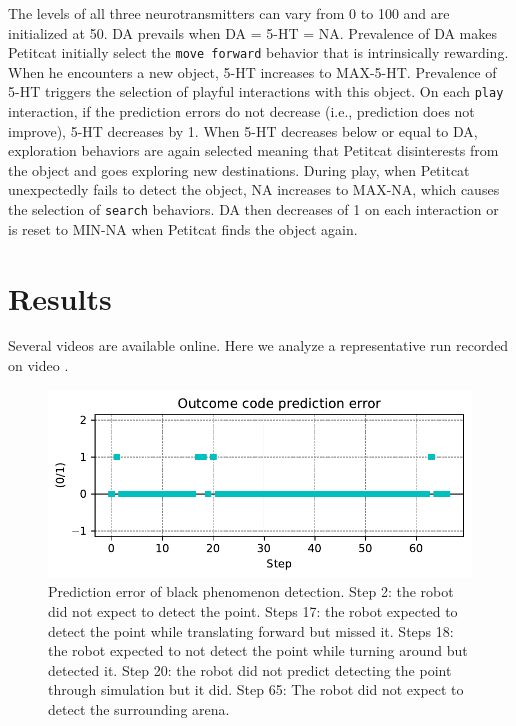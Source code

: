 \documentclass[runningheads]{llncs}
\begin{document}
The levels of all three neurotransmitters can vary from 0 to 100 and are initialized at 50. DA prevails when DA = 5-HT = NA.
Prevalence of DA makes Petitcat initially select the \texttt{move forward} behavior that is intrinsically rewarding.
When he encounters a new object, 5-HT increases to MAX-5-HT. Prevalence of 5-HT triggers the selection of playful interactions with this object.
On each  \texttt{play} interaction, if the prediction errors do not decrease (i.e., prediction does not improve), 5-HT decreases by 1.
When 5-HT decreases below or equal to DA, exploration behaviors are again selected meaning that Petitcat disinterests from the object and goes exploring new destinations. 
During play, when Petitcat unexpectedly fails to detect the object, NA increases to MAX-NA, which causes the selection of \texttt{search} behaviors. 
DA then decreases of 1 on each interaction or is reset to MIN-NA when Petitcat finds the object again.  





\section{Results}

Several videos are available online. 
Here we analyze a representative run recorded on video \cite{georgeon_petitcat_2024}.

\begin{figure}
	\includegraphics[width=\textwidth]{01_Outcome_code.pdf}
	\caption{Prediction error of black phenomenon detection.
	Step 2: the robot did not expect to detect the point.
	Steps 17: the robot expected to detect the point while translating forward but missed it.
	Steps 18: the robot expected to not detect the point while turning around but detected it.
	Step 20: the robot did not predict detecting the point through simulation but it did. 
	Step 65: The robot did not expect to detect the surrounding arena. } \label{fig:yaw_pe}
\end{figure}
\end{document}
